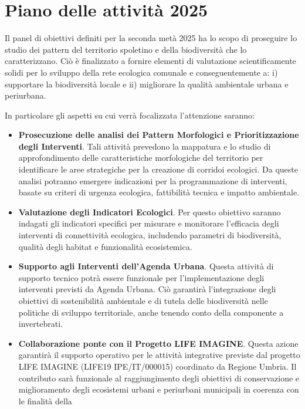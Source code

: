 \documentclass[
  a4paper,
]{book}
\begin{document}
\section{Piano delle attività 2025}\label{piano-delle-attivituxe0-2025}

Il panel di obiettivi definiti per la seconda metà 2025 ha lo scopo di
proseguire lo studio dei pattern del territorio spoletino e della
biodiversità che lo caratterizzano. Ciò è finalizzato a fornire elementi
di valutazione scientificamente solidi per lo sviluppo della rete
ecologica comunale e conseguentemente a: i) supportare la biodiversità
locale e ii) migliorare la qualità ambientale urbana e periurbana.

In particolare gli aspetti su cui verrà focalizzata l'attenzione
saranno:

\begin{itemize}
\item
  \textbf{Prosecuzione delle analisi dei Pattern Morfologici e
  Prioritizzazione degli Interventi}. Tali attività prevedono la
  mappatura e lo studio di approfondimento delle caratteristiche
  morfologiche del territorio per identificare le aree strategiche per
  la creazione di corridoi ecologici. Da queste analisi potranno
  emergere indicazioni per la programmazione di interventi, basate su
  criteri di urgenza ecologica, fattibilità tecnica e impatto
  ambientale.
\item
  \textbf{Valutazione degli Indicatori Ecologici}. Per questo obiettivo
  saranno indagati gli indicatori specifici per misurare e monitorare
  l'efficacia degli interventi di connettività ecologica, includendo
  parametri di biodiversità, qualità degli habitat e funzionalità
  ecosistemica.
\item
  \textbf{Supporto agli Interventi dell'Agenda Urbana}. Questa attività di
  supporto tecnico potrà essere funzionale per l'implementazione degli
  interventi previsti da Agenda Urbana. Ciò garantirà l'integrazione
  degli obiettivi di sostenibilità ambientale e di tutela delle
  biodiversità nelle politiche di sviluppo territoriale, anche tenendo
  conto della componente a invertebrati.
\item
  \textbf{Collaborazione ponte con il Progetto LIFE IMAGINE}. Questa azione
  garantirà il supporto operativo per le attività integrative previste
  dal progetto LIFE IMAGINE (LIFE19 IPE/IT/000015) coordinato da
  Regione Umbria. Il contributo sarà funzionale al raggiungimento
  degli obiettivi di conservazione e miglioramento degli ecosistemi
  urbani e periurbani municipali in coerenza con le finalità della

\end{itemize}
\end{document}
